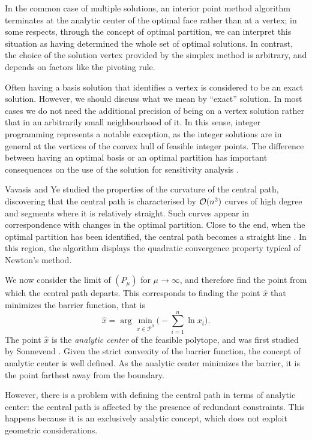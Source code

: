 In the common case of multiple solutions, an interior point method
algorithm terminates
at the analytic center of the optimal face rather than at a vertex; 
in some respects, through the concept of optimal partition, we can interpret
this situation as having determined the whole set of optimal solutions.
In contrast, the choice of the solution vertex provided by the simplex
method is arbitrary, and depends on factors like the pivoting rule.

Often having a basis solution that identifies a vertex is considered
to be an exact solution.
However, we should discuss what we mean by ``exact'' solution. In most
cases we do not need the additional precision of being on a vertex 
solution rather that in an arbitrarily small neighbourhood of it.
In this sense, integer programming represents a notable exception,
as the integer solutions are in general at the vertices of the
convex hull of feasible integer points.
The difference between having an optimal basis or an optimal partition
has important consequences on the use of the solution
for sensitivity analysis \cite{phd:Jansen}.


Vavasis and Ye \cite{VavasisYe} studied the properties of the 
curvature of the central path, discovering that the central path
is characterised by $\mathcal{O}(n^2)$ curves of high degree and
segments where it is relatively straight.
Such curves appear in correspondence with changes in the optimal
partition.
Close to the end, when the optimal partition has been identified,
the central path becomes a straight line \cite{Megiddo}.
In this region, the algorithm displays the quadratic convergence 
property typical of Newton's method.

We now consider
the limit of $(P_\mu)$ for $\mu \to \infty$, and therefore
find the point from which the central path departs.
This corresponds to finding the point $\hat{x}$ 
that minimizes the barrier function, that is
\[
  \hat{x} = \arg \min_{x \in \mathcal{P}^0} \big(-\sum_{i=1}^n \ln x_i \big).
\]
The point $\hat{x}$ is the {\em analytic center} of the feasible polytope, 
and was first studied by Sonnevend \cite{Sonnevend86}.
Given the strict convexity of the barrier function, the concept 
of analytic center is well defined.
As the analytic center minimizes the barrier, it
is the point farthest away from the boundary.

However, there is a problem with defining the central path in terms
of analytic center: the central path is affected by the presence of 
redundant constraints. 
This happens because it is an exclusively analytic concept, which does
not exploit geometric considerations.

